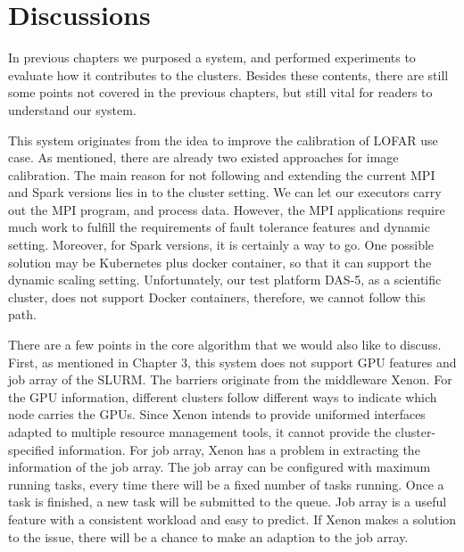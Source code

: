 
\chapter{Discussions} %






% 


In previous chapters we purposed a system, and performed experiments to evaluate how it contributes to the clusters. Besides these contents, there are still some points not covered in the previous chapters, but still vital for readers to understand our system.

This system originates from the idea to improve the calibration of LOFAR use case.
As mentioned, there are already two existed approaches for image calibration. 
The main reason for not following and extending the current MPI and Spark versions lies in to the cluster setting. 
We can let our executors carry out the MPI program, and process data. 
However, the MPI applications require much work to fulfill the requirements of fault tolerance features and dynamic setting. 
Moreover, for Spark versions, it is certainly a way to go. 
One possible solution may be Kubernetes plus docker container, so that it can support the dynamic scaling setting. 
Unfortunately, our test platform DAS-5, as a scientific cluster, does not support Docker containers, therefore, we cannot follow this path.

There are a few points in the core algorithm that we would also like to discuss. 
First, as mentioned in Chapter 3, this system does not support GPU features and job array of the SLURM. 
The barriers originate from the middleware Xenon. For the GPU information, different clusters follow different ways to indicate which node carries the GPUs. 
Since Xenon intends to provide uniformed interfaces adapted to multiple resource management tools, it cannot provide the cluster-specified information. 
For job array, Xenon has a problem in extracting the information of the job array. 
The job array can be configured with maximum running tasks, every time there will be a fixed number of tasks running. 
Once a task is finished, a new task will be submitted to the queue. 
Job array is a useful feature with a consistent workload and easy to predict. 
If Xenon makes a solution to the issue, there will be a chance to make an adaption to the job array.
 
